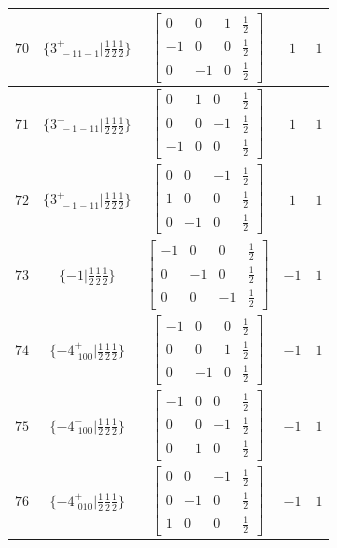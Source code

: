 \documentclass[fleqn,8pt]{jsarticle}
\begin{document}
\begin{longtable}{ccccc}
$ 70 $ & $ \{3^{+}_{\,\,-11-1}|\frac{1}{2} \frac{1}{2} \frac{1}{2}\} $ & $ \begin{bmatrix} 0 & 0 & 1 & \frac{1}{2} \\ -1 & 0 & 0 & \frac{1}{2} \\ 0 & -1 & 0 & \frac{1}{2} \end{bmatrix} $ & $ 1 $ & $ 1 $ \\ \hline
$ 71 $ & $ \{3^{-}_{\,\,-1-11}|\frac{1}{2} \frac{1}{2} \frac{1}{2}\} $ & $ \begin{bmatrix} 0 & 1 & 0 & \frac{1}{2} \\ 0 & 0 & -1 & \frac{1}{2} \\ -1 & 0 & 0 & \frac{1}{2} \end{bmatrix} $ & $ 1 $ & $ 1 $ \\ \hline
$ 72 $ & $ \{3^{+}_{\,\,-1-11}|\frac{1}{2} \frac{1}{2} \frac{1}{2}\} $ & $ \begin{bmatrix} 0 & 0 & -1 & \frac{1}{2} \\ 1 & 0 & 0 & \frac{1}{2} \\ 0 & -1 & 0 & \frac{1}{2} \end{bmatrix} $ & $ 1 $ & $ 1 $ \\ \hline
$ 73 $ & $ \{-1|\frac{1}{2} \frac{1}{2} \frac{1}{2}\} $ & $ \begin{bmatrix} -1 & 0 & 0 & \frac{1}{2} \\ 0 & -1 & 0 & \frac{1}{2} \\ 0 & 0 & -1 & \frac{1}{2} \end{bmatrix} $ & $ -1 $ & $ 1 $ \\ \hline
$ 74 $ & $ \{-4^{+}_{\,\,100}|\frac{1}{2} \frac{1}{2} \frac{1}{2}\} $ & $ \begin{bmatrix} -1 & 0 & 0 & \frac{1}{2} \\ 0 & 0 & 1 & \frac{1}{2} \\ 0 & -1 & 0 & \frac{1}{2} \end{bmatrix} $ & $ -1 $ & $ 1 $ \\ \hline
$ 75 $ & $ \{-4^{-}_{\,\,100}|\frac{1}{2} \frac{1}{2} \frac{1}{2}\} $ & $ \begin{bmatrix} -1 & 0 & 0 & \frac{1}{2} \\ 0 & 0 & -1 & \frac{1}{2} \\ 0 & 1 & 0 & \frac{1}{2} \end{bmatrix} $ & $ -1 $ & $ 1 $ \\ \hline
$ 76 $ & $ \{-4^{+}_{\,\,010}|\frac{1}{2} \frac{1}{2} \frac{1}{2}\} $ & $ \begin{bmatrix} 0 & 0 & -1 & \frac{1}{2} \\ 0 & -1 & 0 & \frac{1}{2} \\ 1 & 0 & 0 & \frac{1}{2} \end{bmatrix} $ & $ -1 $ & $ 1 $ \\ \hline

\end{longtable}
\end{document}
